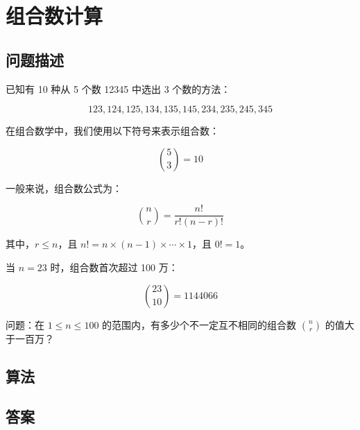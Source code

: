\section{组合数计算}
\subsection{问题描述}
\begin{tcolorbox}
已知有 10 种从 5 个数 12345 中选出 3 个数的方法：

\[ 
123, 124, 125, 134, 135, 145, 234, 235, 245, 345 
\]

在组合数学中，我们使用以下符号来表示组合数：

\[
\binom{5}{3} = 10
\]

一般来说，组合数公式为：

\[
\binom{n}{r} = \frac{n!}{r!(n - r)!}
\]

其中，\(r \leq n\)，且 \(n! = n \times (n-1) \times \cdots \times 1\)，且 \(0! = 1\)。

当 \(n = 23\) 时，组合数首次超过 100 万：

\[
\binom{23}{10} = 1144066
\]

问题：在 \( 1 \leq n \leq 100 \) 的范围内，有多少个不一定互不相同的组合数 \( \binom{n}{r} \) 的值大于一百万？

\end{tcolorbox}

\subsection{算法}


\subsection{答案}
